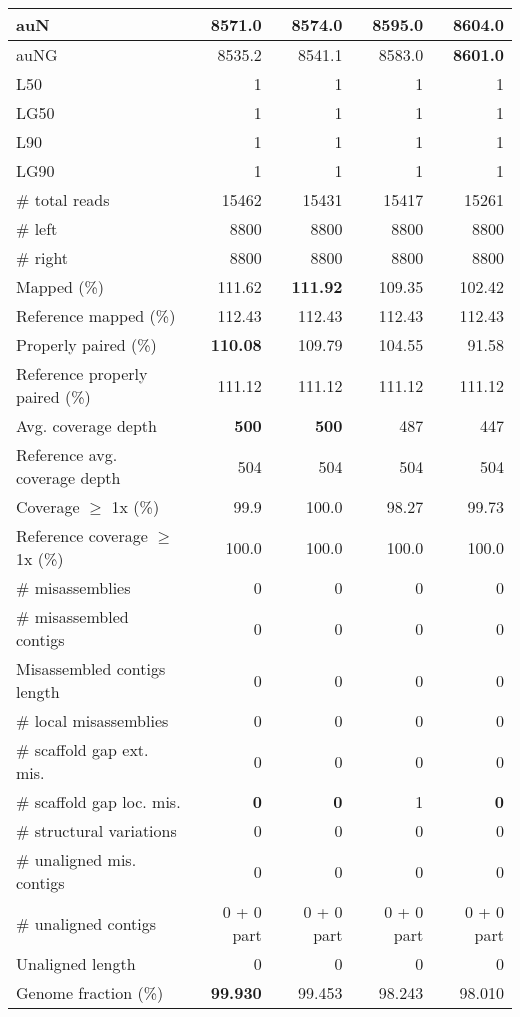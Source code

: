 \documentclass[12pt,a4paper]{article}
\begin{document}
\begin{table}[ht]
\begin{center}
\begin{tabular}{|l*{4}{|r}|}
auN & 8571.0 & 8574.0 & 8595.0 & {\bf 8604.0} \\ \hline
auNG & 8535.2 & 8541.1 & 8583.0 & {\bf 8601.0} \\ \hline
L50 & 1 & 1 & 1 & 1 \\ \hline
LG50 & 1 & 1 & 1 & 1 \\ \hline
L90 & 1 & 1 & 1 & 1 \\ \hline
LG90 & 1 & 1 & 1 & 1 \\ \hline
\# total reads & 15462 & 15431 & 15417 & 15261 \\ \hline
\# left & 8800 & 8800 & 8800 & 8800 \\ \hline
\# right & 8800 & 8800 & 8800 & 8800 \\ \hline
Mapped (\%) & 111.62 & {\bf 111.92} & 109.35 & 102.42 \\ \hline
Reference mapped (\%) & 112.43 & 112.43 & 112.43 & 112.43 \\ \hline
Properly paired (\%) & {\bf 110.08} & 109.79 & 104.55 & 91.58 \\ \hline
Reference properly paired (\%) & 111.12 & 111.12 & 111.12 & 111.12 \\ \hline
Avg. coverage depth & {\bf 500} & {\bf 500} & 487 & 447 \\ \hline
Reference avg. coverage depth & 504 & 504 & 504 & 504 \\ \hline
Coverage $\geq$ 1x (\%) & 99.9 & 100.0 & 98.27 & 99.73 \\ \hline
Reference coverage $\geq$ 1x (\%) & 100.0 & 100.0 & 100.0 & 100.0 \\ \hline
\# misassemblies & 0 & 0 & 0 & 0 \\ \hline
\# misassembled contigs & 0 & 0 & 0 & 0 \\ \hline
Misassembled contigs length & 0 & 0 & 0 & 0 \\ \hline
\# local misassemblies & 0 & 0 & 0 & 0 \\ \hline
\# scaffold gap ext. mis. & 0 & 0 & 0 & 0 \\ \hline
\# scaffold gap loc. mis. & {\bf 0} & {\bf 0} & 1 & {\bf 0} \\ \hline
\# structural variations & 0 & 0 & 0 & 0 \\ \hline
\# unaligned mis. contigs & 0 & 0 & 0 & 0 \\ \hline
\# unaligned contigs & 0 + 0 part & 0 + 0 part & 0 + 0 part & 0 + 0 part \\ \hline
Unaligned length & 0 & 0 & 0 & 0 \\ \hline
Genome fraction (\%) & {\bf 99.930} & 99.453 & 98.243 & 98.010 \\ \hline

\end{tabular}
\end{center}
\end{table}
\end{document}
